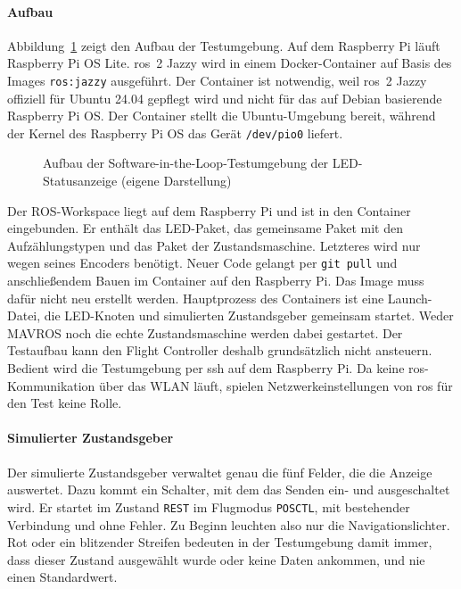             \paragraph{Aufbau}
            Abbildung~\ref{fig:LED_SIL_Architektur} zeigt den Aufbau der Testumgebung. Auf dem Raspberry Pi läuft Raspberry Pi OS Lite. \gls{ros}~2 Jazzy wird in einem Docker-Container auf Basis des Images \texttt{ros:jazzy} ausgeführt. Der Container ist notwendig, weil \gls{ros}~2 Jazzy offiziell für Ubuntu 24.04 gepflegt wird und nicht für das auf Debian basierende Raspberry Pi OS. Der Container stellt die Ubuntu-Umgebung bereit, während der Kernel des Raspberry Pi OS das Gerät \texttt{/dev/pio0} liefert. %

            \begin{figure}[H]
                \centering
                
                \caption{Aufbau der Software-in-the-Loop-Testumgebung der LED-Statusanzeige (eigene Darstellung)}
                \label{fig:LED_SIL_Architektur}
            \end{figure}

            Der ROS-Workspace liegt auf dem Raspberry Pi und ist in den Container eingebunden. Er enthält das LED-Paket, das gemeinsame Paket mit den Aufzählungstypen und das Paket der Zustandsmaschine. Letzteres wird nur wegen seines Encoders benötigt. Neuer Code gelangt per \texttt{git pull} und anschließendem Bauen im Container auf den Raspberry Pi. Das Image muss dafür nicht neu erstellt werden. Hauptprozess des Containers ist eine Launch-Datei, die LED-Knoten und simulierten Zustandsgeber gemeinsam startet. Weder MAVROS noch die echte Zustandsmaschine werden dabei gestartet. Der Testaufbau kann den Flight Controller deshalb grundsätzlich nicht ansteuern. Bedient wird die Testumgebung per \gls{ssh} auf dem Raspberry Pi. Da keine \gls{ros}-Kommunikation über das WLAN läuft, spielen Netzwerkeinstellungen von \gls{ros} für den Test keine Rolle.

            \paragraph{Simulierter Zustandsgeber}
            Der simulierte Zustandsgeber verwaltet genau die fünf Felder, die die Anzeige auswertet. Dazu kommt ein Schalter, mit dem das Senden ein- und ausgeschaltet wird. Er startet im Zustand \texttt{REST} im Flugmodus \texttt{POSCTL}, mit bestehender Verbindung und ohne Fehler. Zu Beginn leuchten also nur die Navigationslichter. Rot oder ein blitzender Streifen bedeuten in der Testumgebung damit immer, dass dieser Zustand ausgewählt wurde oder keine Daten ankommen, und nie einen Standardwert.

